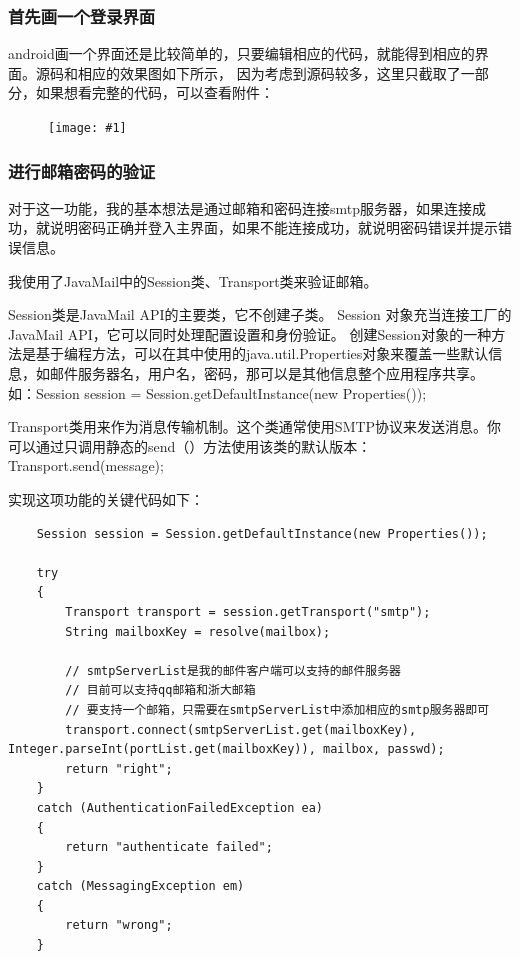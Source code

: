 \documentclass[a4paper,left=2.5cm,right=2.5cm,11pt]{article}
\newcommand{\fic}[1]{\begin{figure}[H]
		\center
		\texttt{[image: \#1]}
	\end{figure}}
\begin{document}
\clearpage

\subsubsection{首先画一个登录界面}
	android画一个界面还是比较简单的，只要编辑相应的代码，就能得到相应的界面。源码和相应的效果图如下所示，
	因为考虑到源码较多，这里只截取了一部分，如果想看完整的代码，可以查看附件：
	\fic{10.png}

\subsubsection{进行邮箱密码的验证}
	对于这一功能，我的基本想法是通过邮箱和密码连接smtp服务器，如果连接成功，就说明密码正确并登入主界面，如果不能连接成功，就说明密码错误并提示错误信息。\par

	我使用了JavaMail中的Session类、Transport类来验证邮箱。\par
	Session类是JavaMail API的主要类，它不创建子类。 Session 对象充当连接工厂的JavaMail API，它可以同时处理配置设置和身份验证。
	创建Session对象的一种方法是基于编程方法，可以在其中使用的java.util.Properties对象来覆盖一些默认信息，如邮件服务器名，用户名，密码，那可以是其他信息整个应用程序共享。
	如：Session session = Session.getDefaultInstance(new Properties());\par
	
	Transport类用来作为消息传输机制。这个类通常使用SMTP协议来发送消息。你可以通过只调用静态的send（）方法使用该类的默认版本：Transport.send(message);\par

	实现这项功能的关键代码如下：

	\begin{lstlisting}
	Session session = Session.getDefaultInstance(new Properties());

    try
    {
        Transport transport = session.getTransport("smtp");
        String mailboxKey = resolve(mailbox);
		
		// smtpServerList是我的邮件客户端可以支持的邮件服务器
		// 目前可以支持qq邮箱和浙大邮箱
		// 要支持一个邮箱，只需要在smtpServerList中添加相应的smtp服务器即可
        transport.connect(smtpServerList.get(mailboxKey), Integer.parseInt(portList.get(mailboxKey)), mailbox, passwd);
        return "right";
    }
    catch (AuthenticationFailedException ea)
    {
        return "authenticate failed";
    }
    catch (MessagingException em)
    {
        return "wrong";
    }
	\end{lstlisting}
\end{document}
